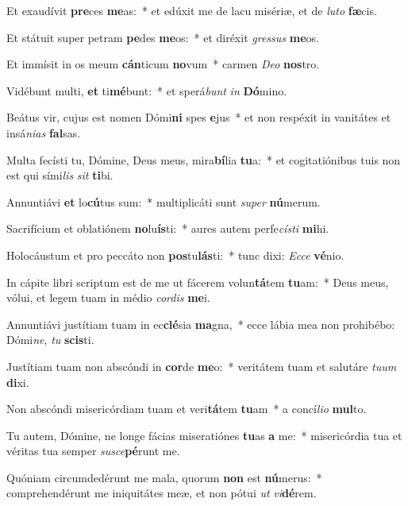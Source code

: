 \item Et exaudívit \textbf{pre}ces \textbf{me}as:~* et edúxit me de lacu misériæ, et de \textit{lu}\textit{to} \textbf{fæ}cis.
\item Et státuit super petram \textbf{pe}des \textbf{me}os:~* et diréxit \textit{gres}\textit{sus} \textbf{me}os.
\item Et immísit in os meum \textbf{cán}ticum \textbf{no}vum~* carmen \textit{De}\textit{o} \textbf{nos}tro.
\item Vidébunt multi, \textbf{et} ti\textbf{mé}bunt:~* et sperá\textit{bunt} \textit{in} \textbf{Dó}mino.
\item Beátus vir, cujus est nomen Dómi\textbf{ni} spes \textbf{e}jus~* et non respéxit in vanitátes et insá\textit{ni}\textit{as} \textbf{fal}sas.
\item Multa fecísti tu, Dómine, Deus meus, mira\textbf{bí}lia \textbf{tu}a:~* et cogitatiónibus tuis non est qui sími\textit{lis} \textit{sit} \textbf{ti}bi.
\item Annuntiávi \textbf{et} lo\textbf{cú}tus sum:~* multiplicáti sunt \textit{su}\textit{per} \textbf{nú}merum.
\item Sacrifícium et oblatiónem \textbf{no}lu\textbf{ís}ti:~* aures autem perfe\textit{cís}\textit{ti} \textbf{mi}hi.
\item Holocáustum et pro peccáto non \textbf{pos}tu\textbf{lás}ti:~* tunc dixi: \textit{Ec}\textit{ce} \textbf{vé}nio.
\item In cápite libri scriptum est de me ut fácerem volun\textbf{tá}tem \textbf{tu}am:~* Deus meus, vólui, et legem tuam in médio \textit{cor}\textit{dis} \textbf{me}i.
\item Annuntiávi justítiam tuam in ec\textbf{clé}sia \textbf{ma}gna,~* ecce lábia mea non prohibébo: Dómi\textit{ne}, \textit{tu} \textbf{scis}ti.
\item Justítiam tuam non abscóndi in \textbf{cor}de \textbf{me}o:~* veritátem tuam et salutáre \textit{tu}\textit{um} \textbf{di}xi.
\item Non abscóndi misericórdiam tuam et veri\textbf{tá}tem \textbf{tu}am~* a concí\textit{li}\textit{o} \textbf{mul}to.
\item Tu autem, Dómine, ne longe fácias miseratiónes \textbf{tu}as \textbf{a} me:~* misericórdia tua et véritas tua semper \textit{su}\textit{sce}\textbf{pé}runt me.
\item Quóniam circumdedérunt me mala, quorum \textbf{non} est \textbf{nú}merus:~* comprehendérunt me iniquitátes meæ, et non pótui \textit{ut} \textit{vi}\textbf{dé}rem.
